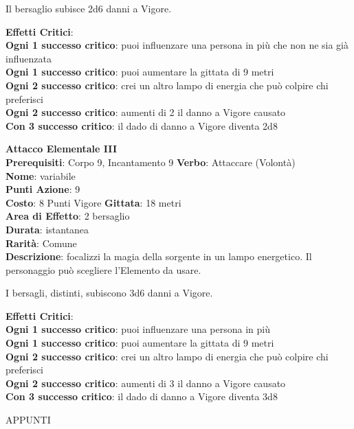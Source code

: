 \documentclass[12pt,a4paper,twoside,openany]{book}
\begin{document}
\begin{multicols}{2}
Il bersaglio subisce 2d6 danni a Vigore.


\textbf{Effetti Critici}:\\
\textbf{Ogni 1 successo critico}: puoi influenzare una persona in più che non ne sia già influenzata\\
\textbf{Ogni 1 successo critico}: puoi aumentare la gittata di 9 metri\\
\textbf{Ogni 2 successo critico}: crei un altro lampo di energia che può colpire chi preferisci\\
\textbf{Ogni 2 successo critico}: aumenti di 2 il danno a Vigore causato\\
\textbf{Con 3 successo critico}: il dado di danno a Vigore diventa 2d8

\textbf{Attacco Elementale III}\\
\textbf{Prerequisiti}: Corpo 9, Incantamento 9
\textbf{Verbo}: Attaccare (Volontà)\\
\textbf{Nome}: variabile\\
\textbf{Punti Azione}: 9\\
\textbf{Costo}: 8 Punti Vigore
\textbf{Gittata}: 18 metri\\
\textbf{Area di Effetto}: 2 bersaglio\\
\textbf{Durata}: istantanea\\
\textbf{Rarità}: Comune\\
\textbf{Descrizione}: focalizzi la magia della sorgente in un lampo energetico. Il personaggio può scegliere l'Elemento da usare.

I bersagli, distinti, subiscono 3d6 danni a Vigore.


\textbf{Effetti Critici}:\\
\textbf{Ogni 1 successo critico}: puoi influenzare una persona in più \\
\textbf{Ogni 1 successo critico}: puoi aumentare la gittata di 9 metri\\
\textbf{Ogni 2 successo critico}: crei un altro lampo di energia che può colpire chi preferisci\\
\textbf{Ogni 2 successo critico}: aumenti di 3 il danno a Vigore causato\\
\textbf{Con 3 successo critico}: il dado di danno a Vigore diventa 3d8

\end{multicols}

\pagebreak

APPUNTI
\pagebreak
\pagebreak
\end{document}
